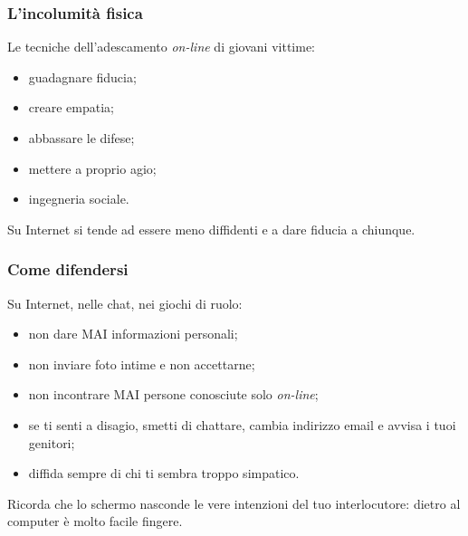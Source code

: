 \documentclass[13pt]{beamer}
\begin{document}
	\begin{frame}
		\frametitle{L'incolumità fisica}
		Le tecniche dell'adescamento \textit{on-line} di giovani vittime:
		\begin{itemize}
			\item {guadagnare fiducia;}
			\item {creare empatia;}
			\item {abbassare le difese;}
			\item {mettere a proprio agio;}
			\item {ingegneria sociale.}
		\end{itemize}
		Su Internet si tende ad essere meno diffidenti e a dare fiducia a chiunque.
	\end{frame}

	\begin{frame}
		\frametitle{Come difendersi}
		Su Internet, nelle chat, nei giochi di ruolo:
		\begin{itemize}
			\item non dare MAI informazioni personali;
			\item non inviare foto intime e non accettarne;
			\item non incontrare MAI persone conosciute solo \textit{on-line};
			\item se ti senti a disagio, smetti di chattare, cambia indirizzo email e \alert{avvisa i tuoi genitori};
			\item diffida sempre di chi ti sembra troppo simpatico.
		\end{itemize}
		Ricorda che lo schermo nasconde le vere intenzioni del tuo interlocutore: dietro al computer è molto facile fingere.
	\end{frame}

	\begin{frame}[standout]

		
		
	\end{frame}



%		

%		
\end{document}

